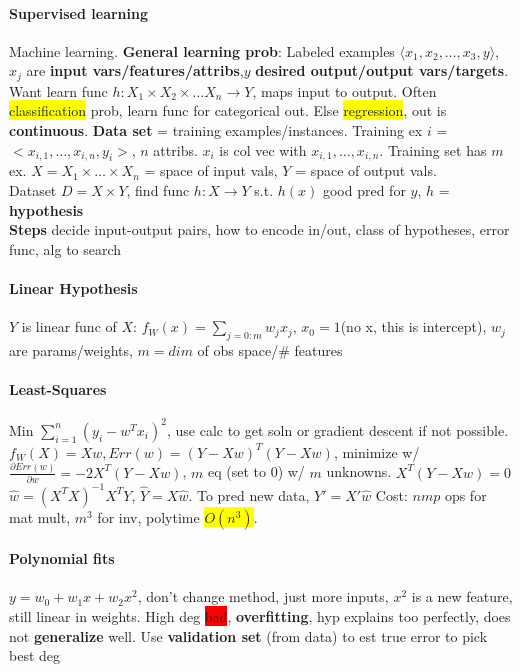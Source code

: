 \paragraph{Supervised learning} Machine learning. \textbf{General
  learning prob}: Labeled examples $\langle
x_1,x_2,\ldots,x_3,y\rangle$, $x_j$ are \textbf{input vars/features/attribs},$y$
\textbf{desired output/output vars/targets}. Want learn func $h: X_1 \times X_2
\times \ldots X_n \to Y$, maps input to
output. Often \colorbox{yellow}{classification} prob, learn func for
categorical out. Else \colorbox{yellow}{regression}, out is
\textbf{continuous}. \textbf{Data set} = training
examples/instances. Training ex $i$ = $<x_{i,1},\ldots,x_{i,n},y_i>$,
$n$ attribs. $x_i$ is col vec with $x_{i,1},\ldots,x_{i,n}$. Training
set has $m$ ex. $X = X_1 \times \ldots \times X_n$ = space of input
vals, $Y$ = space of output vals.
\\ Dataset $D=X \times Y$, find func $h:X \to Y$ s.t. $h(x)$ good pred
for $y$, $h$ = \textbf{hypothesis}
\\ \textbf{Steps} decide input-output pairs, how to encode in/out,
class of hypotheses, error func, alg to search
\paragraph{Linear Hypothesis}
$Y$ is linear func of $X$: $f_W(x)=\sum_{j=0:m}w_jx_j$, $x_0=1$(no x,
this is intercept), $w_j$
are params/weights, $m=dim$ of obs space/\# features
\paragraph{Least-Squares} Min $\sum_{i=1}^n (y_i-w^Tx_i)^2$, use calc
to get soln or gradient descent if not possible. $f_W(X)=Xw,
Err(w)=(Y-Xw)^T(Y-Xw)$, minimize w/
$\frac{\partial{Err(w)}}{\partial{w}}=-2X^T (Y-Xw)$, $m$ eq (set to 0)
w/ $m$ unknowns. $X^T(Y-Xw)=0$
\\ $\hat{w}=(X^TX)^{-1}X^TY$, $\hat{Y}=X\hat{w}$. To pred new data,
$Y'=X'\hat{w}$ Cost: $nmp$ ops for mat mult, $m^3$ for inv, polytime
\colorbox{yellow}{$O(n^3)$}.
\paragraph{Polynomial fits} $y=w_0+w_1x+w_2x^2$, don't change method,
just more inputs, $x^2$ is a new feature, still linear in
weights. High deg \colorbox{red}{bad}, \textbf{overfitting}, hyp
explains too perfectly, does not \textbf{generalize} well. Use
\textbf{validation set} (from data) to est true error to pick best deg

